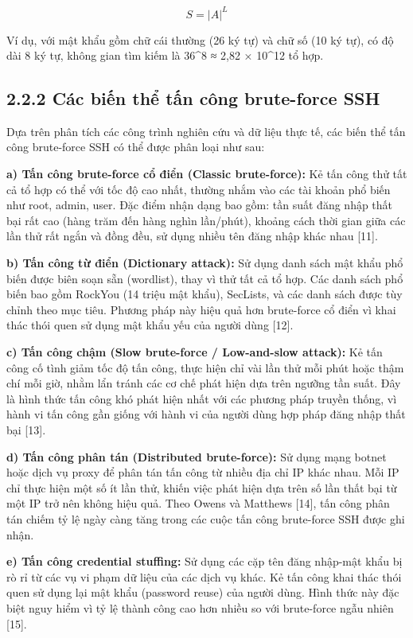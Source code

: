 \documentclass[
  a4paper]{report}
\begin{document}
\[S = |A|^L\]

Ví dụ, với mật khẩu gồm chữ cái thường (26 ký tự) và chữ số (10 ký tự),
có độ dài 8 ký tự, không gian tìm kiếm là 36\^{}8 ≈ 2,82 × 10\^{}12 tổ
hợp.

\subsection{2.2.2 Các biến thể tấn công brute-force
SSH}\label{cuxe1c-biux1ebfn-thux1ec3-tux1ea5n-cuxf4ng-brute-force-ssh}

Dựa trên phân tích các công trình nghiên cứu và dữ liệu thực tế, các
biến thể tấn công brute-force SSH có thể được phân loại như sau:

\textbf{a) Tấn công brute-force cổ điển (Classic brute-force):} Kẻ tấn
công thử tất cả tổ hợp có thể với tốc độ cao nhất, thường nhắm vào các
tài khoản phổ biến như root, admin, user. Đặc điểm nhận dạng bao gồm:
tần suất đăng nhập thất bại rất cao (hàng trăm đến hàng nghìn lần/phút),
khoảng cách thời gian giữa các lần thử rất ngắn và đồng đều, sử dụng
nhiều tên đăng nhập khác nhau {[}11{]}.

\textbf{b) Tấn công từ điển (Dictionary attack):} Sử dụng danh sách mật
khẩu phổ biến được biên soạn sẵn (wordlist), thay vì thử tất cả tổ hợp.
Các danh sách phổ biến bao gồm RockYou (14 triệu mật khẩu), SecLists, và
các danh sách được tùy chỉnh theo mục tiêu. Phương pháp này hiệu quả hơn
brute-force cổ điển vì khai thác thói quen sử dụng mật khẩu yếu của
người dùng {[}12{]}.

\textbf{c) Tấn công chậm (Slow brute-force / Low-and-slow attack):} Kẻ
tấn công cố tình giảm tốc độ tấn công, thực hiện chỉ vài lần thử mỗi
phút hoặc thậm chí mỗi giờ, nhằm lẩn tránh các cơ chế phát hiện dựa trên
ngưỡng tần suất. Đây là hình thức tấn công khó phát hiện nhất với các
phương pháp truyền thống, vì hành vi tấn công gần giống với hành vi của
người dùng hợp pháp đăng nhập thất bại {[}13{]}.

\textbf{d) Tấn công phân tán (Distributed brute-force):} Sử dụng mạng
botnet hoặc dịch vụ proxy để phân tán tấn công từ nhiều địa chỉ IP khác
nhau. Mỗi IP chỉ thực hiện một số ít lần thử, khiến việc phát hiện dựa
trên số lần thất bại từ một IP trở nên không hiệu quả. Theo Owens và
Matthews {[}14{]}, tấn công phân tán chiếm tỷ lệ ngày càng tăng trong
các cuộc tấn công brute-force SSH được ghi nhận.

\textbf{e) Tấn công credential stuffing:} Sử dụng các cặp tên đăng
nhập-mật khẩu bị rò rỉ từ các vụ vi phạm dữ liệu của các dịch vụ khác.
Kẻ tấn công khai thác thói quen sử dụng lại mật khẩu (password reuse)
của người dùng. Hình thức này đặc biệt nguy hiểm vì tỷ lệ thành công cao
hơn nhiều so với brute-force ngẫu nhiên {[}15{]}.
\end{document}
